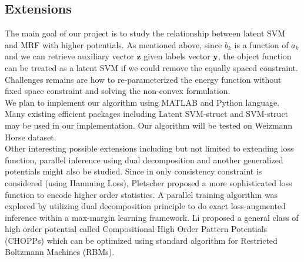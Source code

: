 \documentclass{article}
\begin{document}
	\subsection{Extensions}
	
	The main goal of our project is to study the relationship between latent SVM and MRF with higher potentials. As mentioned above, since $b_k$ is a function of $a_k$ and we can retrieve auxiliary vector $\mathbf{z}$ given labels vector $\mathbf{y}$, the object function can be treated as a latent SVM if we could remove the equally spaced constraint.  Challenges remains are how to re-parameterized the energy function without fixed space constraint and solving the non-convex formulation. \\
	We plan to implement our algorithm using MATLAB and Python language. Many existing efficient packages including Latent SVM-struct\cite{yu2009learning} and SVM-struct\cite{tsochantaridis2005large} may be used in our implementation. Our algorithm will be tested on Weizmann Horse dataset\cite{borenstein2002class}\cite{borenstein2008combined}.\\
	Other interesting possible extensions including but not limited to extending loss function, parallel inference using dual decomposition and another generalized potentials might also be studied. Since in \cite{gouldlearning} only consistency constraint is considered (using Hamming Loss), Pletscher\cite{pletscher2012learning} proposed a more sophisticated loss function to encode  higher order statistics. 
	A parallel training algorithm was explored\cite{komodakis2014framework} by utilizing dual decomposition principle to do exact loss-augmented inference within a max-margin learning framework.
	 Li\cite{li2013exploring} proposed a general class of high order potential called Compositional High Order Pattern Potentials (CHOPPs) which can be optimized using standard algorithm for Restricted Boltzmann Machines (RBMs).\\
	 
\end{document}
